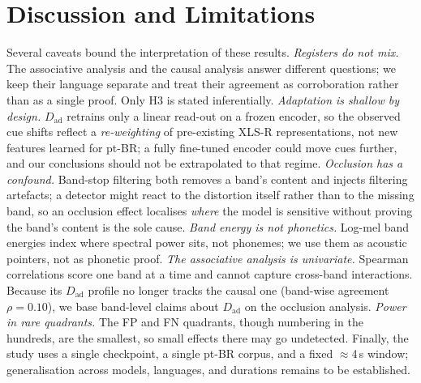 \documentclass[sigconf]{acmart}
\begin{document}
\section{Discussion and Limitations}
Several caveats bound the interpretation of these results. \emph{Registers do not
mix.} The associative analysis and the causal analysis answer different questions;
we keep their language separate and treat their agreement as corroboration rather
than as a single proof. Only H3 is stated inferentially. \emph{Adaptation is shallow by
design.} $D_\mathrm{ad}$ retrains only a linear read-out on a frozen encoder, so the
observed cue shifts reflect a \emph{re-weighting} of pre-existing XLS-R
representations, not new features learned for pt-BR; a fully fine-tuned encoder could
move cues further, and our conclusions should not be extrapolated to that regime.
\emph{Occlusion has a confound.} Band-stop filtering both removes a band's content
and injects filtering artefacts; a detector might react to the distortion itself
rather than to the missing band, so an occlusion effect localises \emph{where} the
model is sensitive without proving the band's content is the sole cause.
\emph{Band energy is not phonetics.} Log-mel band energies index where spectral
power sits, not phonemes; we use them as acoustic pointers, not as phonetic proof.
\emph{The associative analysis is univariate.} Spearman correlations score one band
at a time and cannot capture cross-band interactions. Because its $D_\mathrm{ad}$
profile no longer tracks the causal one (band-wise agreement $\rho=0.10$), we base
band-level claims about $D_\mathrm{ad}$ on the occlusion analysis. \emph{Power in
rare quadrants.} The FP and FN quadrants, though numbering in the hundreds, are the
smallest, so small effects there may go undetected. Finally, the study uses a single
checkpoint, a single pt-BR corpus, and a fixed $\approx$4\,s window; generalisation
across models, languages, and durations remains to be established.

\end{document}
